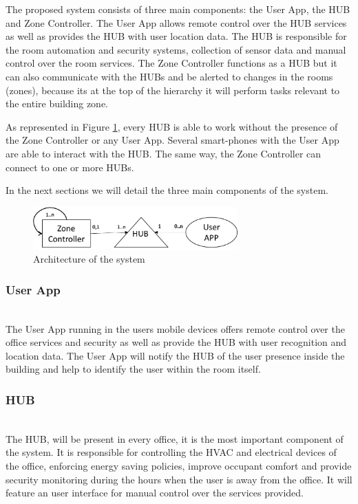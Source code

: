 The proposed system consists of three main components: the User App, the HUB and Zone Controller. The User App allows remote control over the HUB services as well as provides the HUB with user location data. The HUB is responsible for the room automation and security systems, collection of sensor data and manual control over the room services. The Zone Controller functions as a HUB but it can also communicate with the HUBs and be alerted to changes in the rooms (zones), because its at the top of the hierarchy it will perform tasks relevant to the entire building zone.

As represented in Figure \ref{architecture_system}, every HUB is able to work without the presence of the Zone Controller or any User App. Several smart-phones with the User App are able to interact with the HUB. The same way, the Zone Controller can connect to one or more HUBs.

In the next sections we will detail the three main components of the system.

\begin{figure}[h]
\centering
\includegraphics[width=0.7\textwidth]{Figures/architecture}
\caption{Architecture of the system}
\label{architecture_system}
\end{figure}


\subsubsection{User App}\mbox{}\\

The User App running in the users mobile devices offers remote control over the office services and security as well as provide the HUB with user recognition and location data. The User App will notify the HUB of the user presence inside the building and help to identify the user within the room itself.



\subsubsection{HUB}\mbox{}\\

The HUB, will be present in every office, it is the most important component of the system. It is responsible for controlling the HVAC and electrical devices of the office, enforcing energy saving policies, improve occupant comfort and provide security monitoring during the hours when the user is away from the office.
It will feature an user interface for manual control over the services provided.

